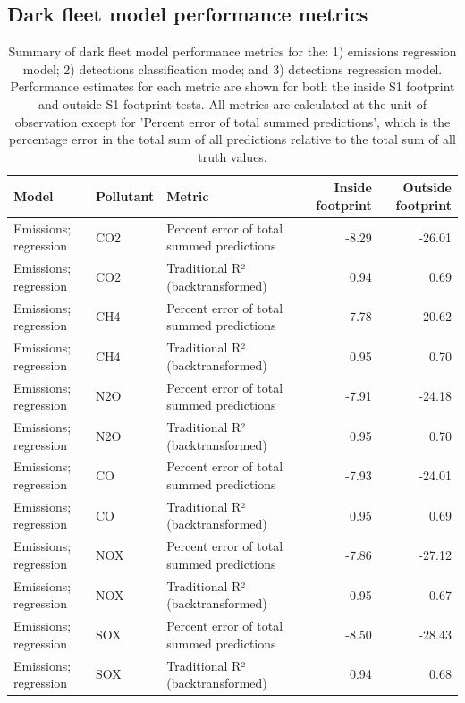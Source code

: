 \documentclass[
  letterpaper,
  DIV=11,
  numbers=noendperiod]{scrartcl}
\begin{document}
\subsection{Dark fleet model performance
metrics}\label{dark-fleet-model-performance-metrics}

\begin{table}[!h]
\centering
\caption{\label{tab:all_performance_metrics_table}Summary of dark fleet model performance metrics for the: 1) emissions regression model; 2) detections classification mode; and 3) detections regression model. Performance estimates for each metric are shown for both the inside S1 footprint and outside S1 footprint tests. All metrics are calculated at the unit of observation except for 'Percent error of total summed predictions', which is the percentage error in the total sum of all predictions relative to the total sum of all truth values.}
\centering
\fontsize{8}{10}\selectfont
\begin{tabular}[t]{l|l|l|r|r}
\hline
Model & Pollutant & Metric & Inside footprint & Outside footprint\\
\hline
Emissions; regression & CO2 & Percent error of total summed predictions & -8.29 & -26.01\\
\hline
Emissions; regression & CO2 & Traditional R² (backtransformed) & 0.94 & 0.69\\
\hline
Emissions; regression & CH4 & Percent error of total summed predictions & -7.78 & -20.62\\
\hline
Emissions; regression & CH4 & Traditional R² (backtransformed) & 0.95 & 0.70\\
\hline
Emissions; regression & N2O & Percent error of total summed predictions & -7.91 & -24.18\\
\hline
Emissions; regression & N2O & Traditional R² (backtransformed) & 0.95 & 0.70\\
\hline
Emissions; regression & CO & Percent error of total summed predictions & -7.93 & -24.01\\
\hline
Emissions; regression & CO & Traditional R² (backtransformed) & 0.95 & 0.69\\
\hline
Emissions; regression & NOX & Percent error of total summed predictions & -7.86 & -27.12\\
\hline
Emissions; regression & NOX & Traditional R² (backtransformed) & 0.95 & 0.67\\
\hline
Emissions; regression & SOX & Percent error of total summed predictions & -8.50 & -28.43\\
\hline
Emissions; regression & SOX & Traditional R² (backtransformed) & 0.94 & 0.68\\

\end{tabular}
\end{table}
\end{document}
